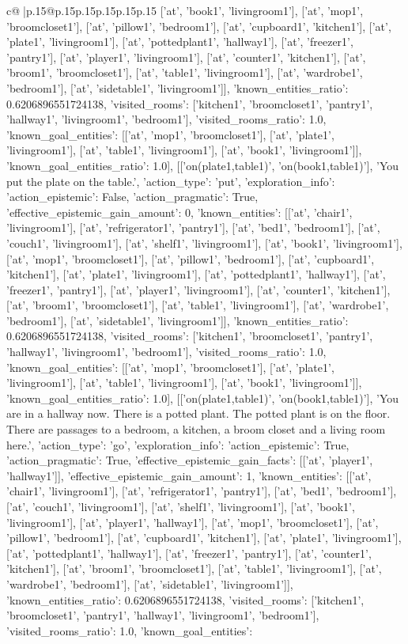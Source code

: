 \documentclass{article}
\begin{document}
{\begin{supertabular}{c@{$\;$}|p{.15\linewidth}@{}p{.15\linewidth}p{.15\linewidth}p{.15\linewidth}p{.15\linewidth}p{.15\linewidth}}
{{{['at', 'book1', 'livingroom1'], ['at', 'mop1', 'broomcloset1'], ['at', 'pillow1', 'bedroom1'], ['at', 'cupboard1', 'kitchen1'], ['at', 'plate1', 'livingroom1'], ['at', 'pottedplant1', 'hallway1'], ['at', 'freezer1', 'pantry1'], ['at', 'player1', 'livingroom1'], ['at', 'counter1', 'kitchen1'], ['at', 'broom1', 'broomcloset1'], ['at', 'table1', 'livingroom1'], ['at', 'wardrobe1', 'bedroom1'], ['at', 'sidetable1', 'livingroom1']], 'known_entities_ratio': 0.6206896551724138, 'visited_rooms': ['kitchen1', 'broomcloset1', 'pantry1', 'hallway1', 'livingroom1', 'bedroom1'], 'visited_rooms_ratio': 1.0, 'known_goal_entities': [['at', 'mop1', 'broomcloset1'], ['at', 'plate1', 'livingroom1'], ['at', 'table1', 'livingroom1'], ['at', 'book1', 'livingroom1']], 'known_goal_entities_ratio': 1.0}}], [['on(plate1,table1)', 'on(book1,table1)'], 'You put the plate on the table.', {'action_type': 'put', 'exploration_info': {'action_epistemic': False, 'action_pragmatic': True, 'effective_epistemic_gain_amount': 0, 'known_entities': [['at', 'chair1', 'livingroom1'], ['at', 'refrigerator1', 'pantry1'], ['at', 'bed1', 'bedroom1'], ['at', 'couch1', 'livingroom1'], ['at', 'shelf1', 'livingroom1'], ['at', 'book1', 'livingroom1'], ['at', 'mop1', 'broomcloset1'], ['at', 'pillow1', 'bedroom1'], ['at', 'cupboard1', 'kitchen1'], ['at', 'plate1', 'livingroom1'], ['at', 'pottedplant1', 'hallway1'], ['at', 'freezer1', 'pantry1'], ['at', 'player1', 'livingroom1'], ['at', 'counter1', 'kitchen1'], ['at', 'broom1', 'broomcloset1'], ['at', 'table1', 'livingroom1'], ['at', 'wardrobe1', 'bedroom1'], ['at', 'sidetable1', 'livingroom1']], 'known_entities_ratio': 0.6206896551724138, 'visited_rooms': ['kitchen1', 'broomcloset1', 'pantry1', 'hallway1', 'livingroom1', 'bedroom1'], 'visited_rooms_ratio': 1.0, 'known_goal_entities': [['at', 'mop1', 'broomcloset1'], ['at', 'plate1', 'livingroom1'], ['at', 'table1', 'livingroom1'], ['at', 'book1', 'livingroom1']], 'known_goal_entities_ratio': 1.0}}], [['on(plate1,table1)', 'on(book1,table1)'], 'You are in a hallway now. There is a potted plant. The potted plant is on the floor. There are passages to a bedroom, a kitchen, a broom closet and a living room here.', {'action_type': 'go', 'exploration_info': {'action_epistemic': True, 'action_pragmatic': True, 'effective_epistemic_gain_facts': [['at', 'player1', 'hallway1']], 'effective_epistemic_gain_amount': 1, 'known_entities': [['at', 'chair1', 'livingroom1'], ['at', 'refrigerator1', 'pantry1'], ['at', 'bed1', 'bedroom1'], ['at', 'couch1', 'livingroom1'], ['at', 'shelf1', 'livingroom1'], ['at', 'book1', 'livingroom1'], ['at', 'player1', 'hallway1'], ['at', 'mop1', 'broomcloset1'], ['at', 'pillow1', 'bedroom1'], ['at', 'cupboard1', 'kitchen1'], ['at', 'plate1', 'livingroom1'], ['at', 'pottedplant1', 'hallway1'], ['at', 'freezer1', 'pantry1'], ['at', 'counter1', 'kitchen1'], ['at', 'broom1', 'broomcloset1'], ['at', 'table1', 'livingroom1'], ['at', 'wardrobe1', 'bedroom1'], ['at', 'sidetable1', 'livingroom1']], 'known_entities_ratio': 0.6206896551724138, 'visited_rooms': ['kitchen1', 'broomcloset1', 'pantry1', 'hallway1', 'livingroom1', 'bedroom1'], 'visited_rooms_ratio': 1.0, 'known_goal_entities': }}}
\end{supertabular}}
\end{document}
